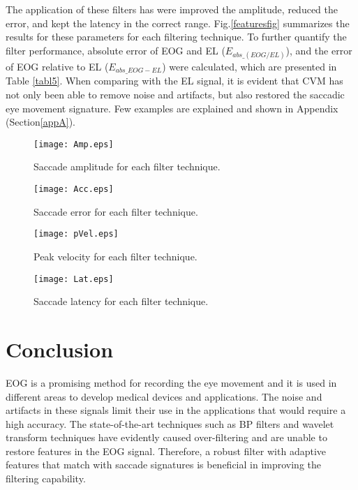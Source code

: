 \documentclass[transmag]{IEEEtran}
\begin{document}
The application of these filters has were improved the amplitude, reduced the error, and kept the latency in the correct range. Fig.\ref{featuresfig} summarizes the results for these parameters for each filtering technique. To further quantify the filter performance, absolute error of EOG and EL ($E_{abs\_(EOG/EL)}$), and the error of EOG relative to EL ($E_{abs\_EOG -EL}$) were calculated, which are presented in Table \ref{tabl5}. When comparing with the EL signal, it is evident that CVM has not only been able to remove noise and artifacts, but also restored the saccadic eye movement signature. Few examples are explained and shown in Appendix (Section\ref{appA}). 

\begin{figure*}
	\centering
	\begin{subfigure}[b]{0.49\textwidth}
		\centering
		\texttt{[image: Amp.eps]}
		\caption{Saccade amplitude for each filter technique.}
		\label{fig5a}
	\end{subfigure}
	\begin{subfigure}[b]{0.49\textwidth}
		\centering
		\texttt{[image: Acc.eps]}
		\caption{Saccade error for each filter technique.}
		\label{fig5b}
	\end{subfigure}
	\hfill
	\begin{subfigure}[b]{0.49\textwidth}
		\centering
		\texttt{[image: pVel.eps]}
		\caption{Peak velocity for each filter technique.}
		\label{fig5c}
	\end{subfigure}
	\begin{subfigure}[b]{0.49\textwidth}
		\centering
		\texttt{[image: Lat.eps]}
		\caption{Saccade latency for each filter technique.}
		\label{fig5d}
	\end{subfigure}
	\caption{Extracted saccade characteristics from EyeLink and filtered EOG signals, grouped by target locations A B C D.}
	\label{featuresfig}
\end{figure*}

\section{Conclusion}
\label{section6}

EOG is a promising method for recording the eye movement and it is used in different areas to develop medical devices and applications. The noise and artifacts in these signals limit their use in the applications that would require a high accuracy. The state-of-the-art techniques such as BP filters and wavelet transform techniques have evidently caused over-filtering and are unable to restore features in the EOG signal. Therefore, a robust filter with adaptive features that match with saccade signatures is beneficial in improving the filtering capability. 
\end{document}
